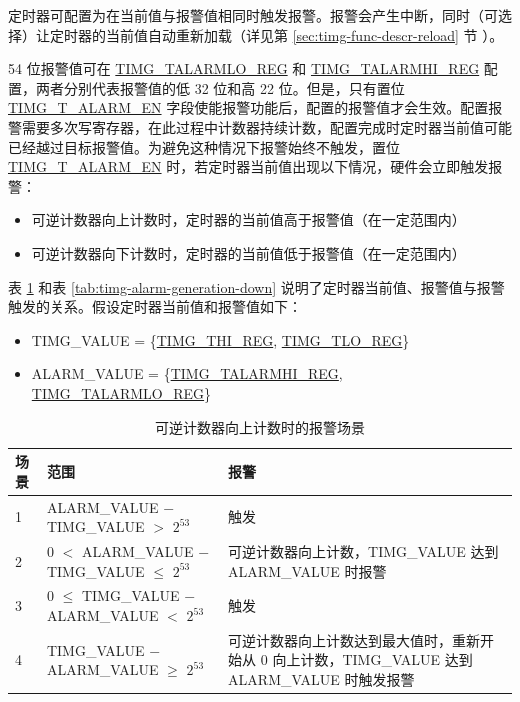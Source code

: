 \documentclass[main\_\_CN.tex]{subfiles}
\begin{document}
定时器可配置为在当前值与报警值相同时触发报警。报警会产生中断，同时（可选择）让定时器的当前值自动重新加载（详见第 \ref{sec:timg-func-descr-reload} 节 \textit{}）。

54 位报警值可在 \hyperref[regdesc:TIMGTXALARMLOREG]{TIMG\_TALARMLO\_REG} 和 \hyperref[regdesc:TIMGTXALARMHIREG]{TIMG\_TALARMHI\_REG} 配置，两者分别代表报警值的低 32 位和高 22 位。但是，只有置位 \hyperref[fielddesc:TIMGTXALARMEN]{TIMG\_T\_ALARM\_EN} 字段使能报警功能后，配置的报警值才会生效。配置报警需要多次写寄存器，在此过程中计数器持续计数，配置完成时定时器当前值可能已经越过目标报警值。为避免这种情况下报警始终不触发，置位 \hyperref[fielddesc:TIMGTXALARMEN]{TIMG\_T\_ALARM\_EN} 时，若定时器当前值出现以下情况，硬件会立即触发报警：

\begin{itemize}
    \item 可逆计数器向上计数时，定时器的当前值高于报警值（在一定范围内）
    \item 可逆计数器向下计数时，定时器的当前值低于报警值（在一定范围内）
\end{itemize}

表 \ref{tab:timg-alarm-generation-up} \textit{} 和表 \ref{tab:timg-alarm-generation-down} \textit{} 说明了定时器当前值、报警值与报警触发的关系。假设定时器当前值和报警值如下：

\begin{itemize}
    \item TIMG\_VALUE = \{\hyperref[regdesc:TIMGTXHIREG]{TIMG\_THI\_REG}, \hyperref[regdesc:TIMGTXLOREG]{TIMG\_TLO\_REG}\}
    \item ALARM\_VALUE = \{\hyperref[regdesc:TIMGTXALARMHIREG]{TIMG\_TALARMHI\_REG}, \hyperref[regdesc:TIMGTXALARMLOREG]{TIMG\_TALARMLO\_REG}\}
\end{itemize}

\begin{table}[H]
\centering
\caption{可逆计数器向上计数时的报警场景}
\label{tab:timg-alarm-generation-up}

\begin{tabular}{|l|l|m{7cm}|}
\hline
\rowcolor{lightgray}
    \textbf{场景} & \textbf{范围} & \textbf{报警} \\\hline
     1 & ALARM\_VALUE $-$ TIMG\_VALUE $>$ $2^{53}$ & 触发 \\\hline
     2 & 0 $<$ ALARM\_VALUE $-$ TIMG\_VALUE $\leq$ $2^{53}$ & 可逆计数器向上计数，TIMG\_VALUE 达到 ALARM\_VALUE 时报警 \\\hline
     3 & 0 $\leq$ TIMG\_VALUE $-$ ALARM\_VALUE $<$ $2^{53}$ & 触发 \\\hline
     4 & TIMG\_VALUE $-$ ALARM\_VALUE $\geq$ $2^{53}$ & 可逆计数器向上计数达到最大值时，重新开始从 0 向上计数，TIMG\_VALUE 达到 ALARM\_VALUE 时触发报警\\\hline
\end{tabular}
\end{table}
\end{document}
